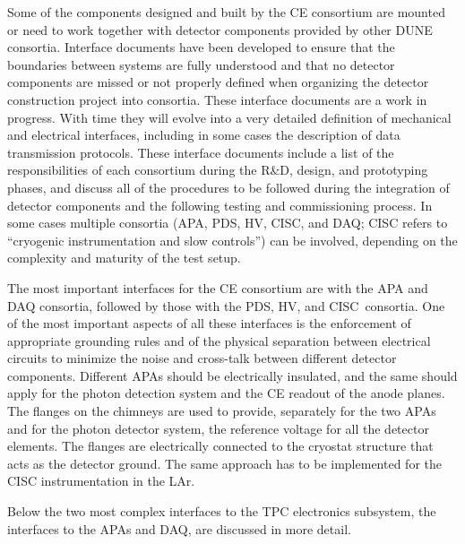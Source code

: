 Some of the components designed and built by the CE consortium are
mounted or need to work together with detector components provided by other DUNE
consortia. Interface documents have been developed to ensure that the boundaries
between systems are fully understood and that no detector components are missed or
not properly defined when organizing the detector construction project into
consortia. These interface documents are a work in progress. With time they will
evolve into a very detailed definition of mechanical and electrical interfaces,
including in some cases the description of data transmission protocols. These
interface documents include a list of the responsibilities of each consortium during the
R\&D, design, and prototyping phases, and discuss all of the procedures to be
followed during the integration of detector components and the following testing
and commissioning process. In some cases multiple consortia (APA, PDS, HV, CISC,
and DAQ; CISC refers to ``cryogenic instrumentation and slow controls'') can be involved, depending on the complexity and maturity of the test setup.

The most important interfaces for the CE consortium are with the APA and DAQ
consortia, followed by those with the PDS, HV, and CISC~consortia. One of the most
important aspects of all these interfaces is the enforcement of appropriate grounding rules
and of the physical separation between electrical circuits to minimize the noise and
cross-talk between different detector components. Different APAs should be electrically
insulated, and the same should apply for the photon detection system and the
CE readout of the anode planes. The flanges on the chimneys are used to provide,
separately for the two APAs and for the photon detector system, the reference
voltage for all the detector elements. The flanges are electrically connected
to the cryostat structure that acts as the detector ground. The same approach
has to be implemented for the CISC instrumentation in the LAr.

Below the two most complex interfaces to the TPC electronics subsystem, the
interfaces to the APAs and DAQ, are discussed in more detail.

